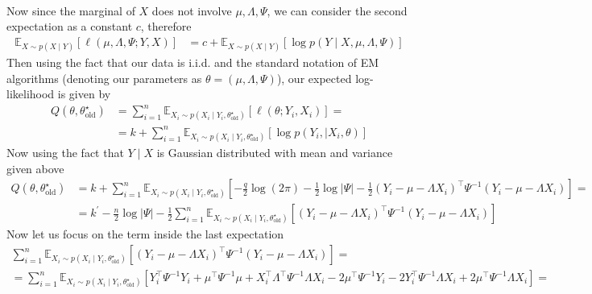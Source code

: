 \documentclass[10pt,notitlepage]{article}
\newcommand{\abs}[1]{\left\vert#1\right\vert}
\newcommand{\mean}[2][]{\mathbb{E}_{#1}\left[#2\right]}
\begin{document}
\begin{exercise}[Solution]
\begin{align*}
        \end{align*}
        Now since the marginal of $X$ does not involve $\mu,\Lambda,\Psi$, we can consider the second expectation as a constant $c$, therefore
        \begin{align*}
            \mean[X\sim p\left(X\mid Y\right)]{\ell\left(\mu,\Lambda,\Psi;Y,X\right)} &= c + \mean[X\sim p\left(X\mid Y\right)]{\log p\left(Y\mid X,\mu, \Lambda,\Psi\right)}
        \end{align*}
        Then using the fact that our data is i.i.d. and the standard notation of EM algorithms (denoting our parameters as $\theta = \left(\mu,\Lambda,\Psi\right)$), our expected log-likelihood is given by
        \begin{align*}
            Q\left(\theta, \theta^\star_{\text{old}}\right) &= \sum_{i=1}^{n}\mean[X_i\sim p\left(X_i\mid Y_i, \theta^\star_{\text{old}}\right)]{\ell\left(\theta;Y_i,X_i\right)} = \\
            &= k + \sum_{i=1}^{n}\mean[X_i\sim p\left(X_i\mid Y_i, \theta^\star_{\text{old}}\right)]{\log p\left(Y_i,\mid X_i,\theta\right)} 
        \end{align*}
        Now using the fact that $Y\mid X$ is Gaussian distributed with mean and variance given above
        \begin{align*}
            Q\left(\theta, \theta^\star_{\text{old}}\right) &= k + \sum_{i=1}^{n}\mean[X_i\sim p\left(X_i\mid Y_i, \theta^\star_{\text{old}}\right)]{ -\frac{q}{2}\log\left(2\pi\right) -\frac{1}{2}\log\abs{\Psi} -\frac{1}{2}\left(Y_i - \mu - \Lambda X_i\right)^\top \Psi^{-1}\left(Y_i - \mu - \Lambda X_i\right)} = \\
            &= k^\prime - \frac{n}{2}\log\abs{\Psi} - \frac{1}{2}\sum_{i=1}^{n}\mean[X_i\sim p\left(X_i\mid Y_i, \theta^\star_{\text{old}}\right)]{\left(Y_i - \mu - \Lambda X_i\right)^\top \Psi^{-1}\left(Y_i - \mu - \Lambda X_i\right)}
        \end{align*}
        Now let us focus on the term inside the last expectation
        \begin{gather*}
            \sum_{i=1}^{n}\mean[X_i\sim p\left(X_i\mid Y_i, \theta^\star_{\text{old}}\right)]{\left(Y_i - \mu - \Lambda X_i\right)^\top \Psi^{-1}\left(Y_i - \mu - \Lambda X_i\right)} = \\
            = \sum_{i=1}^{n}\mean[X_i\sim p\left(X_i\mid Y_i, \theta^\star_{\text{old}}\right)]{Y_i^\top \Psi^{-1} Y_i + \mu^\top \Psi^{-1} \mu + X_i^\top\Lambda^\top\Psi^{-1}\Lambda X_i - 2\mu^\top \Psi^{-1}Y_i - 2Y_i^\top \Psi^{-1}\Lambda X_i + 2 \mu^\top \Psi^{-1}\Lambda X_i} = \\

\end{gather*}
\end{exercise}
\end{document}

